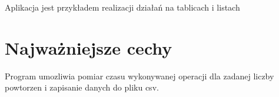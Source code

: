 \-Aplikacja jest przykładem realizacji działań na tablicach i listach\hypertarget{index_etykieta-wazne-cechy}{}\section{\-Najważniejsze cechy}\label{index_etykieta-wazne-cechy}
\-Program umozliwia pomiar czasu wykonywanej operacji dla zadanej liczby powtorzen i zapisanie danych do pliku csv. 
